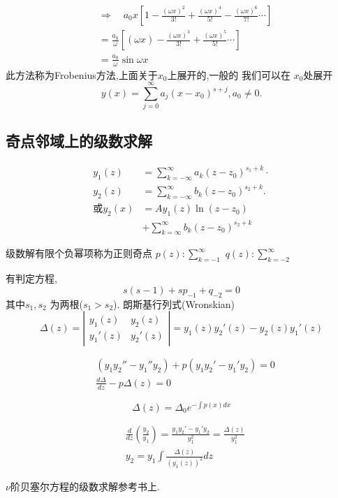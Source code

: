 $$
\begin{aligned}
& \Rightarrow \quad a_0 x\left[1-\frac{(\omega x)^2}{3 !}+\frac{(\omega x)^{4}}{5 !}-\frac{(\omega x)^6}{7 !} \cdots\right] \\
& =\frac{a_0}{\omega}\left[(\omega x)-\frac{(\omega x)^3}{3 !}+\frac{(\omega x)^5}{5 !} \cdots\right] \\
& =\frac{a_0}{\omega} \sin \omega x
\end{aligned}
$$
此方法称为Frobenius方法,上面关于$x_0$上展开的,一般的
我们可以在 $x_0$处展开
$$
y(x)=\sum_{j=0}^{\infty} a_j\left(x-x_0\right)^{s+j}, a_0 \neq 0 .
$$


\subsection{奇点邻域上的级数求解}
$$
\begin{aligned}
y_1(z) & =\sum_{k=-\infty}^{\infty} a_k\left(z-z_0\right)^{s_1+k} \cdot \\
y_2(z) & =\sum_{k=-\infty}^{\infty} b_k\left(z-z_0\right)^{s_2+k} . \\
\text{或} y_2(x) & =A y_1(z) \ln \left(z-z_0\right) \\
& +\sum_{k=\infty}^{\infty} b_k\left(z-z_0\right)^{s_2+k}
\end{aligned}
$$


级数解有限个负幂项称为正则奇点 $p(z): \sum_{k=-1}^{\infty}$
$q(z) : \sum_{k=-2}^{\infty}$

有判定方程,
$$
s(s-1)+s p_{-1}+q_{-2}=0
$$
其中$s_1, s_2$ 为两根($s_1> s_2$).
朗斯基行列式(Wronskian)
$$
\Delta(z)=\left|\begin{array}{ll}
y_1(z) & y_2(z) \\
y_1'(z) & y_2'(z)
\end{array}\right|= y_1(z) y_2'(z) - y_2(z) y_1'(z)
$$

$$
\begin{aligned}
& \left(y_1 y_2''-y_1'' 
y_2\right)+p\left(y_1 y_2'-y_1' y_2\right) = 0\\
& \frac{d \Delta}{d z} - p \Delta(z)=0
\end{aligned}
$$

$$
\Delta(z)=\Delta_0 e^{-\int p(x) d x}
$$

$$
\begin{aligned}
& \frac{d}{d z}\left(\frac{y_{2}}{y_1}\right)=\frac{y_{1} y_{2}'-y_{1}' y_{2}}{y_{1}^2}=\frac{\Delta(z)}{y_{1}^2} \\
& y_{2}=y_{1} \int \frac{\Delta(z)}{\left(y_{1}(z)\right)^2} d z
\end{aligned}
$$

$\nu$阶贝塞尔方程的级数求解参考书上.